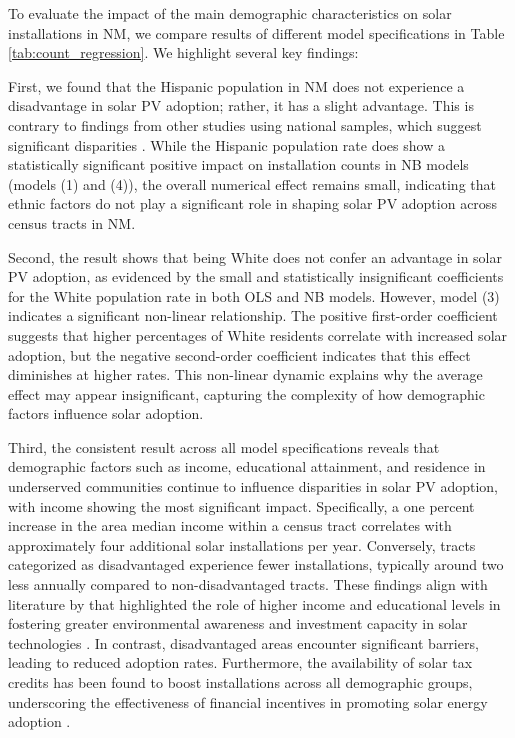 \documentclass[11pt,twoside,letterpaper]{article}
\begin{document}
To evaluate the impact of the main demographic characteristics on solar installations in NM, we compare results of different model specifications in Table \ref{tab:count_regression}. We highlight several key findings: 

First, we found that the Hispanic population in NM does not experience a disadvantage in solar PV adoption; rather, it has a slight advantage. This is contrary to findings from other studies using national samples, which suggest significant disparities \parencite{gao_solar_2022, darghouth_characterizing_2022}. While the Hispanic population rate does show a statistically significant positive impact on installation counts in NB models (models (1) and (4)), the overall numerical effect remains small, indicating that ethnic factors do not play a significant role in shaping solar PV adoption across census tracts in NM.

Second, the result shows that being White does not confer an advantage in solar PV adoption, as evidenced by the small and statistically insignificant coefficients for the White population rate in both OLS and NB models. However, model (3) indicates a significant non-linear relationship. The positive first-order coefficient suggests that higher percentages of White residents correlate with increased solar adoption, but the negative second-order coefficient indicates that this effect diminishes at higher rates. This non-linear dynamic explains why the average effect may appear insignificant, capturing the complexity of how demographic factors influence solar adoption.

Third, the consistent result across all model specifications reveals that demographic factors such as income, educational attainment, and residence in underserved communities continue to influence disparities in solar PV adoption, with income showing the most significant impact. Specifically, a one percent increase in the area median income within a census tract correlates with approximately four additional solar installations per year. Conversely, tracts categorized as disadvantaged experience fewer installations, typically around two less annually compared to non-disadvantaged tracts. These findings align with literature by that highlighted the role of higher income and educational levels in fostering greater environmental awareness and investment capacity in solar technologies \parencite{oshaughnessy_income-targeted_2021, darghouth_characterizing_2022}. In contrast, disadvantaged areas encounter significant barriers, leading to reduced adoption rates. Furthermore, the availability of solar tax credits has been found to boost installations across all demographic groups, underscoring the effectiveness of financial incentives in promoting solar energy adoption \parencite{borenstein_private_2017}. 
\end{document}
